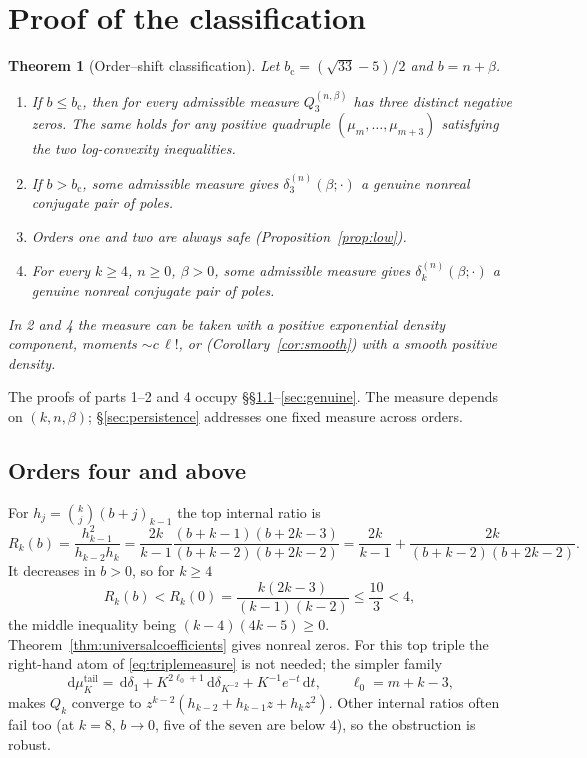 \documentclass[11pt,a4paper]{article}
\newtheorem{theorem}{Theorem}[section]
\theoremstyle{definition}
\theoremstyle{remark}
\newcommand{\dd}{\,\mathrm{d}}
\newcommand{\bc}{b_{\mathrm c}}
\begin{document}
\section{Proof of the classification}\label{sec:classification}

\begin{theorem}[Order--shift classification]\label{thm:main}
Let $\bc=(\sqrt{33}-5)/2$ and $b=n+\beta$.
\begin{enumerate}
\item If $b\le\bc$, then for every admissible measure $Q_3^{(n,\beta)}$ has
three distinct negative zeros. The same holds for any positive quadruple
$(\mu_m,\dots,\mu_{m+3})$ satisfying the two log-convexity inequalities.
\item If $b>\bc$, some admissible measure gives $\delta_3^{(n)}(\beta;\cdot)$ a
genuine nonreal conjugate pair of poles.
\item Orders one and two are always safe (Proposition~\ref{prop:low}).
\item For every $k\ge4$, $n\ge0$, $\beta>0$, some admissible measure gives
$\delta_k^{(n)}(\beta;\cdot)$ a genuine nonreal conjugate pair of poles.
\end{enumerate}
In 2 and 4 the measure can be taken with a positive exponential density
component, moments $\sim c\,\ell!$, or (Corollary~\ref{cor:smooth}) with a
smooth positive density.
\end{theorem}

The proofs of parts 1--2 and 4 occupy \S\S\ref{sec:k4}--\ref{sec:genuine}.
The measure depends on $(k,n,\beta)$; \S\ref{sec:persistence} addresses one
fixed measure across orders.

\subsection{Orders four and above}\label{sec:k4}
For $h_j=\binom kj(b+j)_{k-1}$ the top internal ratio is
\begin{equation}\label{eq:tailratio}
 R_k(b)=\frac{h_{k-1}^2}{h_{k-2}h_k}
 =\frac{2k}{k-1}\frac{(b+k-1)(b+2k-3)}{(b+k-2)(b+2k-2)}
 =\frac{2k}{k-1}+\frac{2k}{(b+k-2)(b+2k-2)} .
\end{equation}
It decreases in $b>0$, so for $k\ge4$
\begin{equation}\label{eq:tailbound}
 R_k(b)<R_k(0)=\frac{k(2k-3)}{(k-1)(k-2)}\le\frac{10}{3}<4,
\end{equation}
the middle inequality being $(k-4)(4k-5)\ge0$. Theorem~\ref{thm:universalcoefficients}
gives nonreal zeros. For this top triple the right-hand atom of
\eqref{eq:triplemeasure} is not needed; the simpler family
\begin{equation}\label{eq:tailmeasure}
 \dd\mu^{\mathrm{tail}}_K=\dd\delta_1+K^{2\ell_0+1}\dd\delta_{K^{-2}}+K^{-1}e^{-t}\dd t,
 \qquad\ell_0=m+k-3,
\end{equation}
makes $Q_k$ converge to $z^{k-2}(h_{k-2}+h_{k-1}z+h_kz^2)$. Other internal
ratios often fail too (at $k=8$, $b\to0$, five of the seven are below
$4$), so the obstruction is robust.
\end{document}
